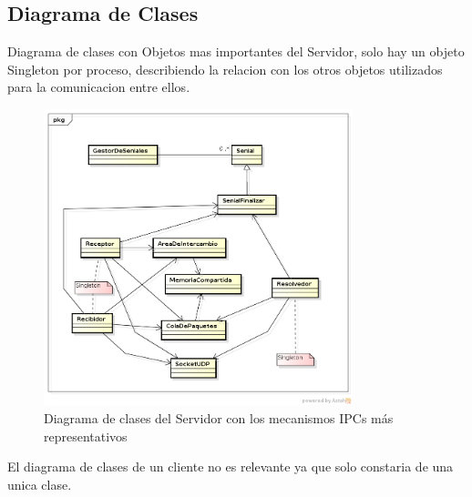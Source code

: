 \documentclass[a4paper,12pt,titlepage]{article}
\begin{document}
\newpage
\subsection{Diagrama de Clases}
Diagrama de clases con Objetos mas importantes del Servidor, solo hay un objeto Singleton por proceso, describiendo la relacion con los otros objetos utilizados para la comunicacion entre ellos. 
\begin{figure}[h!]
\centering
\includegraphics[width=0.8\textwidth]{dia_clases-servidor.png}
\caption{Diagrama de clases del Servidor con los mecanismos IPCs más representativos}
\label{fig:clases}
\end{figure}

El diagrama de clases de un cliente no es relevante ya que solo constaria de una unica clase.
\end{document}
